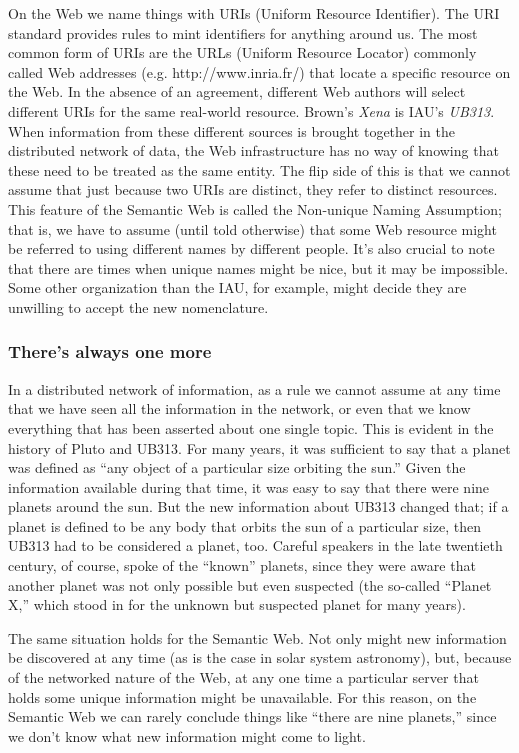 On the Web we name things with URIs (Uniform Resource Identifier). The
URI standard provides rules to mint identifiers for anything around us.
The most common form of URIs are the URLs (Uniform Resource Locator)
commonly called Web addresses (e.g. http://www.inria.fr/) that locate a
specific resource on the Web. In the absence of an agreement, different
Web authors will select different URIs for the same real-world resource.
Brown's \emph{Xena} is IAU's \emph{UB313}. When information from these
different sources is brought together in the distributed network of
data, the Web infrastructure has no way of knowing that these need to be
treated as the same entity. The flip side of this is that we cannot
assume that just because two URIs are distinct, they refer to distinct
resources. This feature of the Semantic Web is called the Non-unique
Naming Assumption; that is, we have to assume (until told otherwise)
that some Web resource might be referred to using different names by
different people. It's also crucial to note that there are times when
unique names might be nice, but it may be impossible. Some other
organization than the IAU, for example, might decide they are unwilling
to accept the new nomenclature.

\subsubsection{There's always one more}
\label{openworld}

In a distributed network of information, as a rule we cannot assume at
any time that we have seen all the information in the network, or even
that we know everything that has been asserted about one single topic.
This is evident in the history of Pluto and UB313. For many years, it
was sufficient to say that a planet was defined as ``any object of a
particular size orbiting the sun.'' Given the information available
during that time, it was easy to say that there were nine planets around
the sun. But the new information about UB313 changed that; if a planet
is defined to be any body that orbits the sun of a particular size, then
UB313 had to be considered a planet, too. Careful speakers in the late
twentieth century, of course, spoke of the ``known'' planets, since they
were aware that another planet was not only possible but even suspected
(the so-called ``Planet X,'' which stood in for the unknown but
suspected planet for many years).

The same situation holds for the Semantic Web. Not only might new
information be discovered at any time (as is the case in solar system
astronomy), but, because of the networked nature of the Web, at any one
time a particular server that holds some unique information might be
unavailable. For this reason, on the Semantic Web we can rarely conclude
things like ``there are nine planets,'' since we don't know what new
information might come to light.

